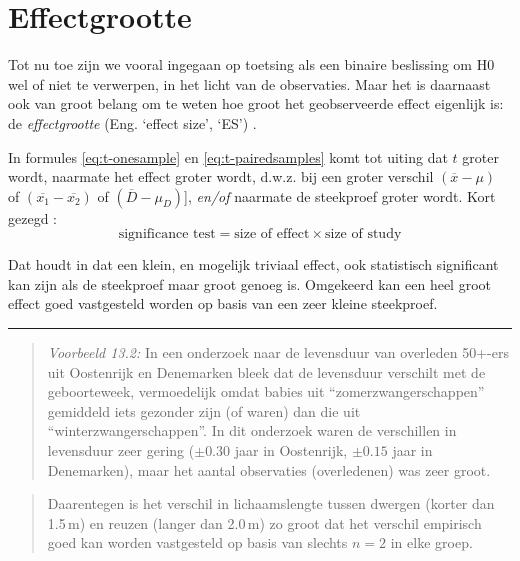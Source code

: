 \documentclass[
]{book}
\begin{document}
\hypertarget{sec:ttoets-effectgrootte}{%
\section{Effectgrootte}\label{sec:ttoets-effectgrootte}}

Tot nu toe zijn we vooral ingegaan op toetsing als een binaire
beslissing om H0 wel of niet te verwerpen, in het licht van de
observaties. Maar het is daarnaast ook van groot belang om te weten hoe
groot het geobserveerde effect eigenlijk is: de \emph{effectgrootte} (Eng.
`effect size', `ES') \citep{Cohen88, Thom02, Naka07}.

In formules \eqref{eq:t-onesample} en \eqref{eq:t-pairedsamples} komt tot uiting
dat \(t\) groter wordt,
naarmate het effect groter wordt, d.w.z. bij een groter verschil
\((\overline{x}-\mu)\) of \((\overline{x_1}-\overline{x_2})\) of
\((\overline{D}-\mu_D)\){]}, \emph{en/of} naarmate de steekproef groter wordt.
Kort gezegd \citep[ p.338, formule 11.10]{Rose08}:
\begin{equation}
  \label{eq:Rose08}
    \textrm{significance test} = 
    \textrm{size of effect} \times \textrm{size of study}
\end{equation}

Dat houdt
in dat een klein, en mogelijk triviaal effect, ook statistisch
significant kan zijn als de steekproef maar groot genoeg is. Omgekeerd
kan een heel groot effect goed vastgesteld worden op basis van een zeer
kleine steekproef.

\begin{center}\rule{0.5\linewidth}{0.5pt}\end{center}

\begin{quote}
\emph{Voorbeeld 13.2:}
In een onderzoek naar de levensduur van overleden 50+-ers uit Oostenrijk
en Denemarken \citep{Dobl99} bleek dat de levensduur verschilt met de
geboorteweek, vermoedelijk omdat babies uit ``zomerzwangerschappen''
gemiddeld iets gezonder zijn (of waren) dan die uit
``winterzwangerschappen''. In dit onderzoek waren de verschillen in
levensduur zeer gering (\(\pm 0.30\) jaar in Oostenrijk, \(\pm 0.15\) jaar
in Denemarken), maar het aantal observaties (overledenen) was zeer groot.
\end{quote}

\begin{quote}
Daarentegen is het verschil in lichaamslengte tussen dwergen (korter dan
1.5 m) en reuzen (langer dan 2.0 m) zo groot dat het verschil empirisch goed kan worden
vastgesteld op basis van slechts \(n=2\) in elke groep.
\end{quote}
\end{document}
